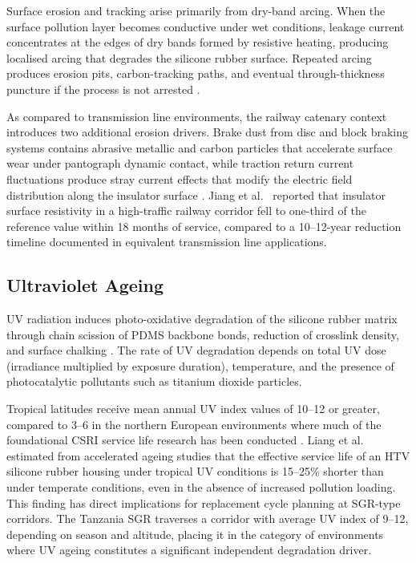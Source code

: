 \documentclass[preprint,12pt,3p]{elsarticle}
\begin{document}
Surface erosion and tracking arise primarily from dry-band arcing.
When the surface pollution layer becomes conductive under wet conditions,
leakage current concentrates at the edges of dry bands formed by
resistive heating, producing localised arcing that degrades the silicone
rubber surface. Repeated arcing produces erosion pits, carbon-tracking
paths, and eventual through-thickness puncture if the process is not
arrested \cite{Montoya2016, Jiang2019}.

As compared to transmission line environments, the railway catenary context
introduces two additional erosion drivers. Brake dust from disc and
block braking systems contains abrasive metallic and carbon particles
that accelerate surface wear under pantograph dynamic contact, while
traction return current fluctuations produce stray current effects that
modify the electric field distribution along the insulator surface
\cite{Diagnostics2021}. Jiang et al.\ \cite{Jiang2019} reported that
insulator surface resistivity in a high-traffic railway corridor fell to
one-third of the reference value within 18 months of service, compared
to a 10--12-year reduction timeline documented in equivalent transmission
line applications.

\subsection{Ultraviolet Ageing}

UV radiation induces photo-oxidative degradation of the silicone rubber
matrix through chain scission of PDMS backbone bonds, reduction of
crosslink density, and surface chalking \cite{Saleem2022, Ramirez2020}.
The rate of UV degradation depends on total UV dose (irradiance
multiplied by exposure duration), temperature, and the presence of
photocatalytic pollutants such as titanium dioxide particles.

Tropical latitudes receive mean annual UV index values of 10--12 or
greater, compared to 3--6 in the northern European environments where
much of the foundational CSRI service life research has been conducted
\cite{Ramirez2020}. Liang et al.\ \cite{Saleem2022} estimated from
accelerated ageing studies that the effective service life of an HTV
silicone rubber housing under tropical UV conditions is 15--25\% shorter
than under temperate conditions, even in the absence of increased
pollution loading. This finding has direct implications for replacement
cycle planning at SGR-type corridors. The Tanzania SGR traverses a
corridor with average UV index of 9--12, depending on season and
altitude, placing it in the category of environments where UV ageing
constitutes a significant independent degradation driver.
\end{document}

